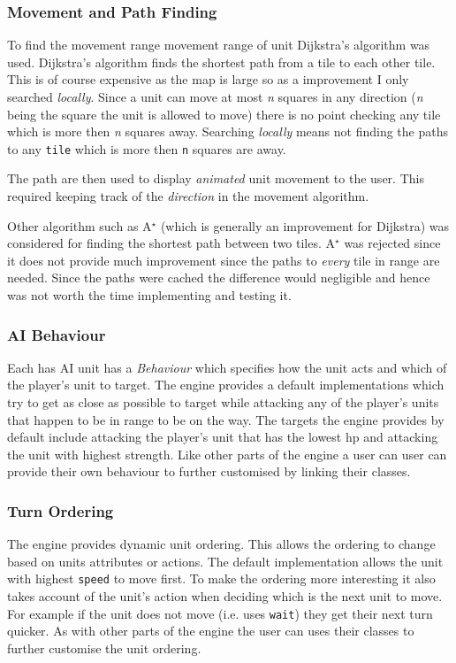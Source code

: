 \subsubsection{Movement and Path Finding}

To find the movement range movement range of unit Dijkstra's algorithm was used. Dijkstra's algorithm finds the shortest path from a tile to each other tile. This is of course expensive as the map is large so as a improvement I only searched \emph{locally}. Since a unit can move at most \emph{n} squares in any direction (\emph{n} being the square the unit is allowed to move) there is no point checking any tile which is more then \emph{n} squares away.  Searching \emph{locally} means not finding the paths to any \texttt{tile} which is more then \texttt{n} squares are away.

The path are then used to display \emph{animated} unit movement to the user.  This required keeping track of the \emph{direction} in the movement algorithm. 

\def\astar{A$^{\star}$ }

Other algorithm such as \astar (which is generally an improvement for Dijkstra) was considered for finding the shortest path between two tiles. \astar was rejected since it does not provide much improvement since the paths to \emph{every} tile in range are needed. Since the paths were cached the difference would negligible and hence was not worth the time implementing and testing it.

\subsubsection{AI Behaviour}
Each has AI unit has a \emph{Behaviour} which specifies how the unit acts and which of the player's unit to target.  The engine provides a default implementations which try to get as close as possible to target while attacking any of the player's units that happen to be in range to be on the way.  The targets the engine provides by default include attacking the player's unit that has the lowest hp and attacking the unit with highest strength. Like other parts of the engine a user can user can provide their own behaviour to further customised by linking their classes.

\subsubsection{Turn Ordering}
The engine provides dynamic unit ordering.  This allows the ordering to change based on units attributes or actions.  The default implementation allows the unit with highest \texttt{speed} to move first.  To make the ordering more interesting it also takes account of the unit's action when deciding which is the next unit to move. For example if the unit does not move (i.e. uses \texttt{wait}) they get their next turn quicker. As with other parts of the engine the user can uses their classes to further customise the unit ordering.

